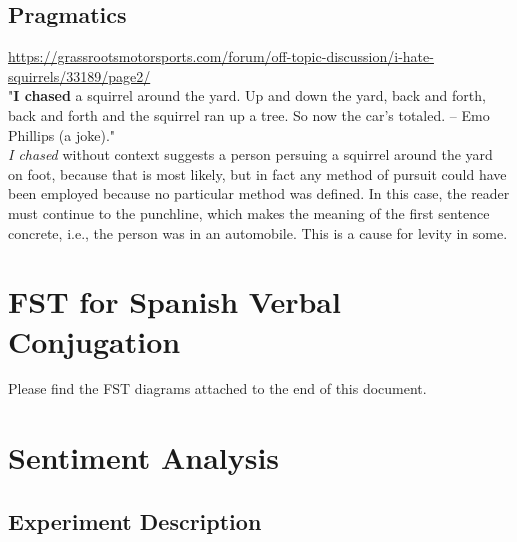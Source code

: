 \documentclass{amsart}
\theoremstyle{definition}
\theoremstyle{remark}
\numberwithin{equation}{section}
\begin{document}
\subsection{Pragmatics}

\url{https://grassrootsmotorsports.com/forum/off-topic-discussion/i-hate-squirrels/33189/page2/} \\

"\textbf{I chased} a squirrel around the yard. Up and down the yard, back and forth, back and forth and the squirrel ran up a tree. So now the car's totaled. -- Emo Phillips (a joke)." \\

\textit{I chased} without context suggests a person persuing a squirrel around the yard on foot, because that is most likely, but in fact any method of pursuit could have been employed because no particular method was defined. In this case, the reader must continue to the punchline, which makes the meaning of the first sentence concrete, i.e., the person was in an automobile. This is a cause for levity in some. \\


\section{FST for Spanish Verbal Conjugation}
\begin{table}[ht]
\centering
{}
\end{table}

Please find the FST diagrams attached to the end of this document. \\

\section{Sentiment Analysis}

\subsection{Experiment Description}
\end{document}
